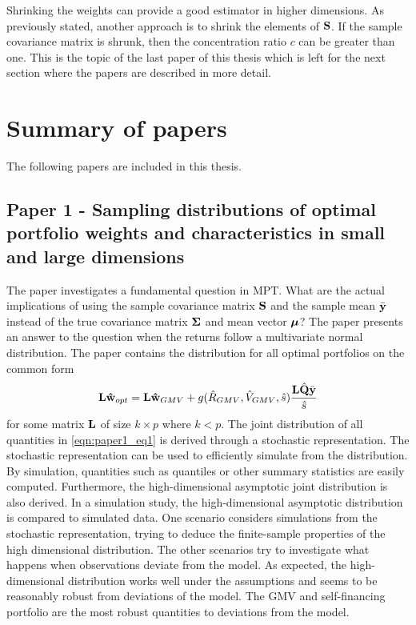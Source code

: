 \documentclass[12pt, oneside]{book}\usepackage{knitr}
\begin{document}
{Shrinking the weights can provide a good estimator in higher dimensions. 
As previously stated, another approach is to shrink the elements of $\mathbf{S}$.
If the sample covariance matrix is shrunk, then the concentration ratio $c$ can be greater than one.
This is the topic of the last paper of this thesis which is left for the next section where the papers are described in more detail.

\chapter{Summary of papers}\label{ch:papersummary}


The following papers are included in this thesis.
\section{Paper 1 - Sampling distributions of optimal portfolio weights and characteristics in small and large dimensions}\label{sec:paper1}
The paper investigates a fundamental question in MPT. 
What are the actual implications of using the sample covariance matrix $\mathbf{S}$ and the sample mean $\bar{\mathbf{y}}$ instead of the true covariance matrix $\mathbf{\Sigma}$ and mean vector $\mbox{\boldmath$\mu$}$?
The paper presents an answer to the question when the returns follow a multivariate normal distribution. 
The paper contains the distribution for all optimal portfolios on the common form
\begin{equation}\label{eqn:paper1_eq1}
  \mathbf{L}\mathbf{\hat{w}}_{opt} = \mathbf{L}\mathbf{\hat{w}}_{GMV} + g(\hat{R}_{GMV}, \hat{V}_{GMV}, \hat{s})\frac{\mathbf{L}\hat{\mathbf{Q}}\bar{\mathbf{y}}}{\hat{s}}
\end{equation}
for some matrix $\mathbf{L}$ of size $k \times p$ where $k<p$.
The joint distribution of all quantities in \eqref{eqn:paper1_eq1} is derived through a stochastic representation. 
The stochastic representation can be used to efficiently simulate from the distribution.
By simulation, quantities such as quantiles or other summary statistics are easily computed.
Furthermore, the high-dimensional asymptotic joint distribution is also derived. 
In a simulation study, the high-dimensional asymptotic distribution is compared to simulated data.
One scenario considers simulations from the stochastic representation, trying to deduce the finite-sample properties of the high dimensional distribution.
The other scenarios try to investigate what happens when observations deviate from the model.
As expected, the high-dimensional distribution works well under the assumptions and seems to be reasonably robust from deviations of the model.
The GMV and self-financing portfolio are the most robust quantities to deviations from the model.

}
\end{document}
